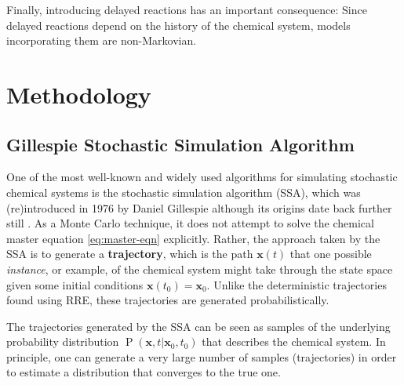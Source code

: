 \documentclass[english,letterpaper,12pt]{article}
\newcommand{\defkeywd}[1]{\textbf{#1}}
\renewcommand{\vec}[1]{\ensuremath{\mathbf{#1}}}
\DeclareMathOperator{\Prob}{P}
\begin{document}
\begin{doublespacing}
Finally, introducing delayed reactions has an important consequence: Since delayed reactions depend on the history of the chemical system, models incorporating them are non-Markovian. 



\section{Methodology} %
\label{sec:methodology}

\subsection{Gillespie Stochastic Simulation Algorithm} %
\label{sub:gillespie-ssa}

One of the most well-known and widely used  algorithms for simulating stochastic chemical systems is the stochastic simulation algorithm (SSA), which was (re)introduced in 1976 by Daniel Gillespie although its origins date back further still . As a Monte Carlo technique, it does not attempt to solve the chemical master equation \eqref{eq:master-eqn} explicitly. Rather, the approach taken by the SSA is to generate a \defkeywd{trajectory}, which is the path $\vec{x}(t)$ that one possible \emph{instance}, or example, of the chemical system might take through the state space given some initial conditions $\vec{x}(t_0) = \vec{x}_0$. Unlike the deterministic trajectories found using RRE, these trajectories are generated probabilistically. 


The trajectories generated by the SSA can be seen as samples of the underlying probability distribution $\Prob(\vec{x}, t | \vec{x}_0, t_0)$ that describes the chemical system. In principle, one can generate a very large number of samples (trajectories) in order to estimate a distribution that converges to the true one.


\end{doublespacing}
\end{document}
